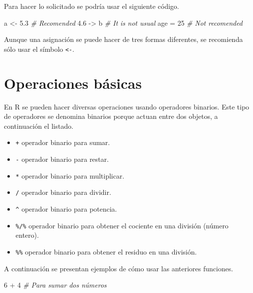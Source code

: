 \documentclass[10pt,]{krantz}
\makeatletter
\newenvironment{Shaded}{\begin{snugshade}}{\end{snugshade}}
\newcommand{\DecValTok}[1]{\textcolor[rgb]{0.00,0.00,0.81}{{#1}}}
\newcommand{\FloatTok}[1]{\textcolor[rgb]{0.00,0.00,0.81}{{#1}}}
\newcommand{\StringTok}[1]{\textcolor[rgb]{0.31,0.60,0.02}{{#1}}}
\newcommand{\CommentTok}[1]{\textcolor[rgb]{0.56,0.35,0.01}{\textit{{#1}}}}
\newcommand{\NormalTok}[1]{{#1}}
\providecommand{\tightlist}{%
  \setlength{\itemsep}{0pt}\setlength{\parskip}{0pt}}
\let\proglang=\textsf
\newenvironment{kframe}{%
\medskip{}
\setlength{\fboxsep}{.8em}
 \def\at@end@of@kframe{}%
 \ifinner\ifhmode%
  \def\at@end@of@kframe{\end{minipage}}%
  \begin{minipage}{\columnwidth}%
 \fi\fi%
 \def\FrameCommand##1{\hskip\@totalleftmargin \hskip-\fboxsep
 \colorbox{shadecolor}{##1}\hskip-\fboxsep
     \hskip-\linewidth \hskip-\@totalleftmargin \hskip\columnwidth}%
 \MakeFramed {\advance\hsize-\width
   \@totalleftmargin\z@ \linewidth\hsize
   \@setminipage}}%
 {\par\unskip\endMakeFramed%
 \at@end@of@kframe}
\renewenvironment{Shaded}{\begin{kframe}}{\end{kframe}}
\let\BeginKnitrBlock\begin \let\EndKnitrBlock\end
\makeatother
\begin{document}
Para hacer lo solicitado se podría usar el siguiente código.

\begin{Shaded}
\begin{Highlighting}[]
\NormalTok{a <-}\StringTok{ }\FloatTok{5.3} \CommentTok{# Recomended}
\FloatTok{4.6} \NormalTok{->}\StringTok{ }\NormalTok{b }\CommentTok{# It is not usual}
\NormalTok{age =}\StringTok{ }\DecValTok{25} \CommentTok{# Not recomended}
\end{Highlighting}
\end{Shaded}

\BeginKnitrBlock{rmdimportant}
Aunque una asignación se puede hacer de tres formas diferentes, se
recomienda sólo usar el símbolo \texttt{\textless{}-}.
\EndKnitrBlock{rmdimportant}

\section{\texorpdfstring{Operaciones básicas
}{Operaciones básicas }}\label{operaciones-basicas}

En \proglang{R} se pueden hacer diversas operaciones usando operadores
binarios. Este tipo de operadores se denomina binarios porque actuan
entre dos objetos, a continuación el listado.

\begin{itemize}
\tightlist
\item
  \texttt{+} operador binario para sumar.
\item
  \texttt{-} operador binario para restar.
\item
  \texttt{*} operador binario para multiplicar.
\item
  \texttt{/} operador binario para dividir.
\item
  \texttt{\^{}} operador binario para potencia.
\item
  \texttt{\%/\%} operador binario para obtener el cociente en una
  división (número entero).
\item
  \texttt{\%\%} operador binario para obtener el residuo en una
  división.
\end{itemize}

A continuación se presentan ejemplos de cómo usar las anteriores
funciones.

\begin{Shaded}
\begin{Highlighting}[]
\DecValTok{6} \NormalTok{+}\StringTok{ }\DecValTok{4}  \CommentTok{# Para sumar dos números}
\end{Highlighting}
\end{Shaded}
\end{document}
